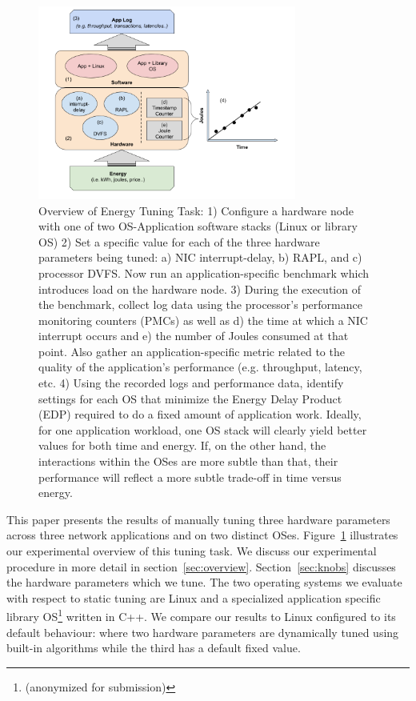 \begin{figure}
  \includegraphics[width=8.5cm]{figures/setup.png}
  \caption{ Overview of Energy Tuning Task:  1) Configure a hardware node with  one of two OS-Application software stacks (Linux or library OS)
  2) Set a specific value for each of the three hardware parameters being tuned: a) NIC interrupt-delay,  b) RAPL, and c) processor DVFS. Now run an application-specific benchmark which introduces load on the hardware node.
  3) During the execution of the benchmark, collect log data using the processor's performance monitoring counters (PMCs) as well as d) the time at which a NIC interrupt occurs and e) the number of Joules consumed at that point.  Also gather an application-specific metric related to the quality of the application's performance (e.g. throughput, latency, etc. 4) Using the recorded logs and performance data, identify settings for each OS that minimize the Energy Delay Product (EDP) required to do a fixed amount of application work. Ideally, for one application workload, one OS stack will clearly yield better values for both time and energy.  If, on the other hand, the interactions within the OSes are more subtle than that, their performance will reflect a more subtle trade-off in time versus energy.}
 \label{fig:setup}
\end{figure}

This paper presents the results of manually tuning three hardware parameters across three network applications and on two distinct OSes.
Figure~\ref{fig:setup} illustrates our experimental overview of this tuning task.
We discuss our experimental procedure in more detail in section~\ref{sec:overview}.
Section~\ref{sec:knobs} discusses the hardware parameters which we tune. The two operating systems we evaluate with respect to static tuning are Linux and a specialized application specific library OS\footnote{(anonymized for submission)} written in C++.   We compare our results to Linux configured to its default behaviour: where two hardware parameters are dynamically tuned using built-in algorithms while the third has a default fixed value.   



